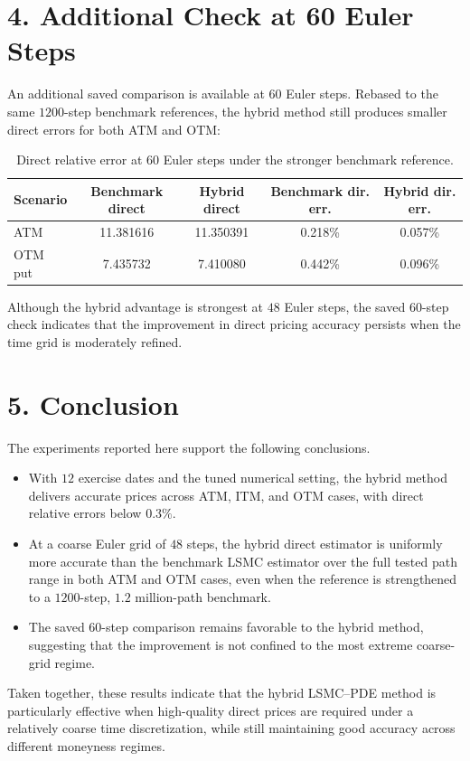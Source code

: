 \documentclass[11pt,a4paper]{article}
\begin{document}
\clearpage
\section*{4. Additional Check at 60 Euler Steps}

An additional saved comparison is available at \(60\) Euler steps. Rebased to the same \(1200\)-step benchmark references, the hybrid method still produces smaller direct errors for both ATM and OTM:

\begin{table}[h!]
\centering
\caption{Direct relative error at 60 Euler steps under the stronger benchmark reference.}
\begin{tabular}{lcccc}
\toprule
Scenario & Benchmark direct & Hybrid direct & Benchmark dir. err. & Hybrid dir. err. \\
\midrule
ATM & 11.381616 & 11.350391 & 0.218\% & 0.057\% \\
OTM put & 7.435732 & 7.410080 & 0.442\% & 0.096\% \\
\bottomrule
\end{tabular}
\end{table}

Although the hybrid advantage is strongest at \(48\) Euler steps, the saved \(60\)-step check indicates that the improvement in direct pricing accuracy persists when the time grid is moderately refined.

\section*{5. Conclusion}

The experiments reported here support the following conclusions.

\begin{itemize}
\item With \(12\) exercise dates and the tuned numerical setting, the hybrid method delivers accurate prices across ATM, ITM, and OTM cases, with direct relative errors below \(0.3\%\).
\item At a coarse Euler grid of \(48\) steps, the hybrid direct estimator is uniformly more accurate than the benchmark LSMC estimator over the full tested path range in both ATM and OTM cases, even when the reference is strengthened to a \(1200\)-step, \(1.2\) million-path benchmark.
\item The saved \(60\)-step comparison remains favorable to the hybrid method, suggesting that the improvement is not confined to the most extreme coarse-grid regime.
\end{itemize}

Taken together, these results indicate that the hybrid LSMC--PDE method is particularly effective when high-quality direct prices are required under a relatively coarse time discretization, while still maintaining good accuracy across different moneyness regimes.
\end{document}
